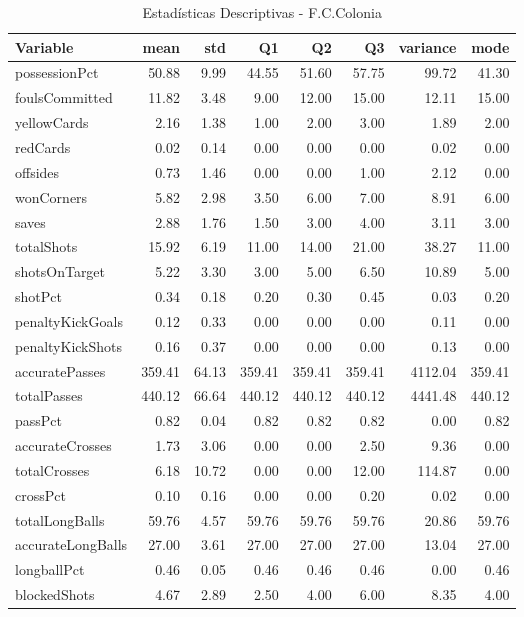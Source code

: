 \begin{table}[H]
\centering
\caption{Estadísticas Descriptivas - F.C.Colonia}
\label{tab:ger_1_fc_kln}
\small
\begin{tabular}{lrrrrrrr}
\hline
Variable & mean & std & Q1 & Q2 & Q3 & variance & mode \\
\hline
possessionPct & 50.88 & 9.99 & 44.55 & 51.60 & 57.75 & 99.72 & 41.30 \\
foulsCommitted & 11.82 & 3.48 & 9.00 & 12.00 & 15.00 & 12.11 & 15.00 \\
yellowCards & 2.16 & 1.38 & 1.00 & 2.00 & 3.00 & 1.89 & 2.00 \\
redCards & 0.02 & 0.14 & 0.00 & 0.00 & 0.00 & 0.02 & 0.00 \\
offsides & 0.73 & 1.46 & 0.00 & 0.00 & 1.00 & 2.12 & 0.00 \\
wonCorners & 5.82 & 2.98 & 3.50 & 6.00 & 7.00 & 8.91 & 6.00 \\
saves & 2.88 & 1.76 & 1.50 & 3.00 & 4.00 & 3.11 & 3.00 \\
totalShots & 15.92 & 6.19 & 11.00 & 14.00 & 21.00 & 38.27 & 11.00 \\
shotsOnTarget & 5.22 & 3.30 & 3.00 & 5.00 & 6.50 & 10.89 & 5.00 \\
shotPct & 0.34 & 0.18 & 0.20 & 0.30 & 0.45 & 0.03 & 0.20 \\
penaltyKickGoals & 0.12 & 0.33 & 0.00 & 0.00 & 0.00 & 0.11 & 0.00 \\
penaltyKickShots & 0.16 & 0.37 & 0.00 & 0.00 & 0.00 & 0.13 & 0.00 \\
accuratePasses & 359.41 & 64.13 & 359.41 & 359.41 & 359.41 & 4112.04 & 359.41 \\
totalPasses & 440.12 & 66.64 & 440.12 & 440.12 & 440.12 & 4441.48 & 440.12 \\
passPct & 0.82 & 0.04 & 0.82 & 0.82 & 0.82 & 0.00 & 0.82 \\
accurateCrosses & 1.73 & 3.06 & 0.00 & 0.00 & 2.50 & 9.36 & 0.00 \\
totalCrosses & 6.18 & 10.72 & 0.00 & 0.00 & 12.00 & 114.87 & 0.00 \\
crossPct & 0.10 & 0.16 & 0.00 & 0.00 & 0.20 & 0.02 & 0.00 \\
totalLongBalls & 59.76 & 4.57 & 59.76 & 59.76 & 59.76 & 20.86 & 59.76 \\
accurateLongBalls & 27.00 & 3.61 & 27.00 & 27.00 & 27.00 & 13.04 & 27.00 \\
longballPct & 0.46 & 0.05 & 0.46 & 0.46 & 0.46 & 0.00 & 0.46 \\
blockedShots & 4.67 & 2.89 & 2.50 & 4.00 & 6.00 & 8.35 & 4.00 \\

\end{tabular}
\end{table}
